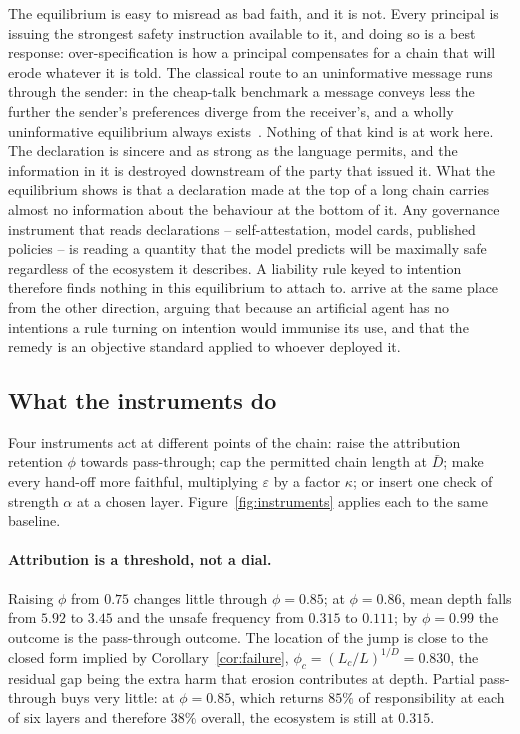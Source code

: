 \documentclass[11pt,a4paper]{article}
\theoremstyle{definition}
\begin{document}
The equilibrium is easy to misread as bad faith, and it is not. Every principal
is issuing the strongest safety instruction available to it, and doing so is a
best response: over-specification is how a principal compensates for a chain
that will erode whatever it is told. The classical route to an uninformative
message runs through the sender: in the cheap-talk benchmark a message conveys
less the further the sender's preferences diverge from the receiver's, and a
wholly uninformative equilibrium always exists~\citep{crawford1982strategic}.
Nothing of that kind is at work here. The declaration is sincere and as strong
as the language permits, and the information in it is destroyed downstream of
the party that issued it. What the equilibrium shows is that a
declaration made at the top of a long chain carries almost no information about
the behaviour at the bottom of it. Any governance instrument that reads
declarations -- self-attestation, model cards, published policies -- is reading
a quantity that the model predicts will be maximally safe regardless of the
ecosystem it describes. A liability rule keyed to intention therefore finds
nothing in this equilibrium to attach to. \citet{ayres2024risky} arrive at the
same place from the other direction, arguing that because an artificial agent
has no intentions a rule turning on intention would immunise its use, and that
the remedy is an objective standard applied to whoever deployed it.

\subsection{What the instruments do}
\label{sec:instruments}

Four instruments act at different points of the chain: raise the attribution
retention $\phi$ towards pass-through; cap the permitted chain length at
$\bar D$; make every hand-off more faithful, multiplying $\varepsilon$ by a
factor $\kappa$; or insert one check of strength $\alpha$ at a chosen layer.
Figure~\ref{fig:instruments} applies each to the same baseline.

\paragraph{Attribution is a threshold, not a dial.}
Raising $\phi$ from $0.75$ changes little through $\phi=0.85$; at $\phi=0.86$,
mean depth falls from $5.92$ to $3.45$ and the unsafe frequency from $0.315$ to
$0.111$; by $\phi=0.99$ the outcome is the pass-through outcome. The location of
the jump is close to the closed form implied by Corollary~\ref{cor:failure},
$\phi_{c}=(L_{c}/L)^{1/D}=0.830$, the residual gap being the extra harm that
erosion contributes at depth. Partial pass-through buys very little: at
$\phi=0.85$, which returns $85\%$ of responsibility at each of six layers and
therefore $38\%$ overall, the ecosystem is still at $0.315$.
\end{document}
